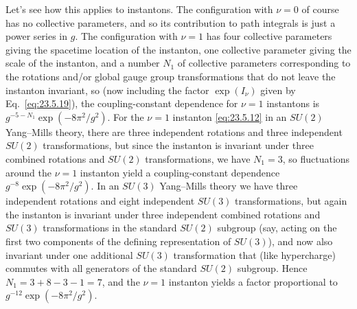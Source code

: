 Let's see how this applies to instantons. The configuration with $\nu=0$
of course has no collective parameters, and so its contribution to path
integrals is just a power series in $g$. The configuration with $\nu=1$
has four collective parameters giving the spacetime location of the
instanton, one collective parameter giving the scale of the instanton,
and a number $N_1$ of collective parameters corresponding to the
rotations and/or global gauge group transformations that do not leave
the instanton invariant, so (now including the factor $\exp(I_\nu)$ given
by Eq.~\eqref{eq:23.5.19}), the coupling-constant dependence for $\nu=1$
instantons is $g^{-5-N_1}\exp(-8\pi^2/g^2)$. For the $\nu=1$ instanton
\eqref{eq:23.5.12} in an $SU(2)$ Yang--Mills theory, there are three
independent rotations and three independent $SU(2)$ transformations,
but since the instanton is invariant under three combined rotations and
$SU(2)$ transformations, we have $N_1=3$, so fluctuations around the
$\nu=1$ instanton yield a coupling-constant dependence
$g^{-8}\exp(-8\pi^2/g^2)$. In an $SU(3)$ Yang--Mills theory we have three
independent rotations and eight independent $SU(3)$ transformations,
but again the instanton is invariant under three independent combined
rotations and $SU(3)$ transformations in the standard $SU(2)$ subgroup
(say, acting on the first two components of the defining representation
of $SU(3)$), and now also invariant under one additional $SU(3)$
transformation that (like hypercharge) commutes with all generators of
the standard $SU(2)$ subgroup. Hence $N_1=3+8-3-1=7$, and the $\nu=1$
instanton yields a factor proportional to
$g^{-12}\exp(-8\pi^2/g^2)$.

